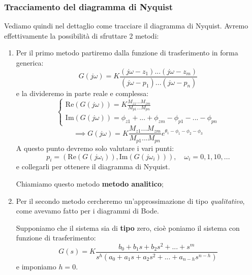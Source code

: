 \documentclass[a4paper,11pt]{article}
\begin{document}
\subsubsection{Tracciamento del diagramma di Nyquist}
Vediamo quindi nel dettaglio come tracciare il diagramma di Nyquist.
Avremo effettivamente la possibilità di sfruttare 2 metodi:
\begin{enumerate}
	\item 
		Per il primo metodo partiremo dalla funzione di trasferimento in forma generica:
		$$
		G(j \omega) = K \frac{ (j\omega - z_1) ... (j\omega - z_m) }{ (j\omega - p_1) ... (j\omega - p_n) }
		$$
		e la divideremo in parte reale e complessa:
		\[
			\begin{cases}
				\mathrm{Re}\left( G(j\omega) \right) = K \frac{M_{z1} ... M_{zm}}{M_{p1} ... M_{pn}} \\
				\mathrm{Im} \left( G(j\omega) \right) = \phi_{z1} + ... + \phi_{zm} - \phi_{p1} - ... - \phi_{pn}
			\end{cases}
		\]
		\[
			\implies
			G(j\omega) = K \frac{M_{z1} ... M_{zm}}{M_{p1} ... M_{pn}} e^{\theta_1 - \phi_1 - \phi_2 - \phi_3
			}
		\]
		A questo punto devremo solo valutare i vari punti:
		$$
		p_i = \left( \mathrm{Re}\left( G(j\omega_i) \right), \mathrm{Im}\left( G(j\omega_i) \right) \right), \quad \omega_i = 0, 1, 10, ...
		$$
		e collegarli per ottenere il diagramma di Nyquist.

		Chiamiamo questo metodo \textbf{metodo analitico};
	
	\item
		Per il secondo metodo cercheremo un'approssimazione di tipo \textit{qualitativo}, come avevamo fatto per i diagrammi di Bode.

		Supponiamo che il sistema sia di \textbf{tipo} zero, cioè poniamo il sistema con funzione di trasferimento:
		$$
		G(s) = K \frac{ b_0 + b_1 s + b_2 s^2 + ... + s^m }{ s^h ( a_0 + a_1 s + a_2 s^2 + ... + a_{n - h} s^{n - h} ) }
		$$
		e imponiamo $h = 0$.


\end{enumerate}
\end{document}
